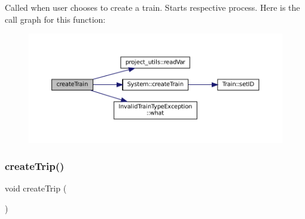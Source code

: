 Called when user chooses to create a train. Starts respective process. Here is the call graph for this function\+:
\nopagebreak
\begin{figure}[H]
\begin{center}
\leavevmode
\includegraphics[width=350pt]{Train-System_8cpp_ac6b94afb09ed41f340489a61f7349d3d_cgraph}
\end{center}
\end{figure}
\mbox{\label{Train-System_8cpp_ad4041e4e0eaf523f74477b7d0409d493}} 
\subsubsection{\texorpdfstring{create\+Trip()}{createTrip()}}
{\footnotesize\ttfamily void create\+Trip (\begin{DoxyParamCaption}{ }\end{DoxyParamCaption})}

